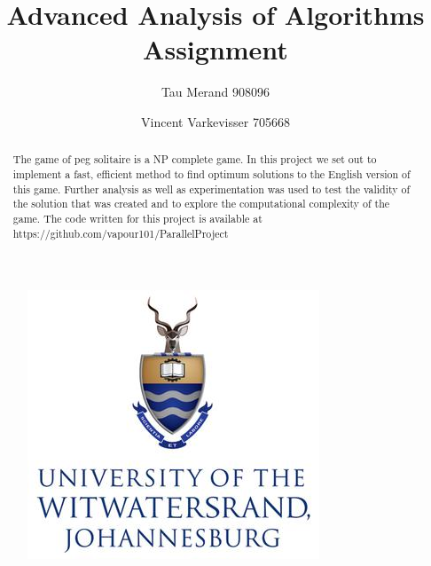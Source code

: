 \documentclass[10pt]{article}
\begin{document}
\parindent0pt

\title{Advanced Analysis of Algorithms Assignment}
\author{Tau Merand 908096 \and Vincent Varkevisser 705668}
\maketitle
\begin{abstract}
The game of peg solitaire is a NP complete game. In this project we set out to implement a fast, efficient method to find optimum solutions to the English version of this game. Further analysis as well as experimentation was used to test the validity of the solution that was created and to explore the computational complexity of the game. The code written for this project is available at https://github.com/vapour101/ParallelProject
\end{abstract}
\begin{figure}[h]
\centering
\includegraphics[scale=0.75]{wits_logo}
\end{figure}
\newpage
\tableofcontents
\newpage
\end{document}
